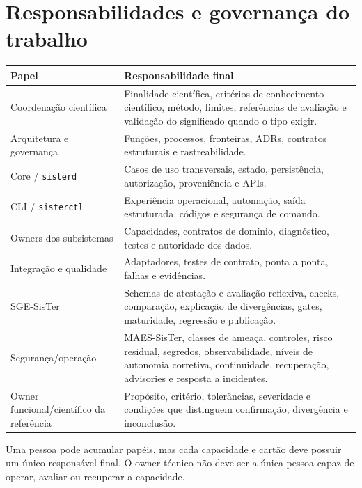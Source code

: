 \documentclass[11pt,a4paper,oneside]{article}
\begin{document}
\section{Responsabilidades e governança do trabalho}

\begin{tabularx}{\textwidth}{P{4.1cm}Y}
\toprule
\textbf{Papel} & \textbf{Responsabilidade final} \\
\midrule
Coordenação científica & Finalidade científica, critérios de conhecimento científico, método, limites, referências de avaliação e validação do significado quando o tipo exigir. \\
Arquitetura e governança & Funções, processos, fronteiras, ADRs, contratos estruturais e rastreabilidade. \\
Core / \texttt{sisterd} & Casos de uso transversais, estado, persistência, autorização, proveniência e APIs. \\
CLI / \texttt{sisterctl} & Experiência operacional, automação, saída estruturada, códigos e segurança de comando. \\
Owners dos subsistemas & Capacidades, contratos de domínio, diagnóstico, testes e autoridade dos dados. \\
Integração e qualidade & Adaptadores, testes de contrato, ponta a ponta, falhas e evidências. \\
SGE-SisTer & Schemas de atestação e avaliação reflexiva, checks, comparação, explicação de divergências, gates, maturidade, regressão e publicação. \\
Segurança/operação & MAES-SisTer, classes de ameaça, controles, risco residual, segredos, observabilidade, níveis de autonomia corretiva, continuidade, recuperação, advisories e resposta a incidentes. \\
Owner funcional/científico da referência & Propósito, critério, tolerâncias, severidade e condições que distinguem confirmação, divergência e inconclusão. \\
\bottomrule
\end{tabularx}

Uma pessoa pode acumular papéis, mas cada capacidade e cartão deve possuir um único responsável final. O owner técnico não deve ser a única pessoa capaz de operar, avaliar ou recuperar a capacidade.
\end{document}
